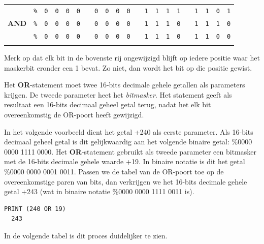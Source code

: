 \begin{center}
	\begin{tabular}{ccccccccccccccccccccc}
	  & \texttt{\%} & \texttt{0} & \texttt{0} & \texttt{0} & \texttt{0} & & \texttt{0} & \texttt{0} & \texttt{0} & \texttt{0} & & \texttt{1} & \texttt{1} & \texttt{1} & \texttt{1} & & \texttt{1} & \texttt{1} & \texttt{0} & \texttt{1} \\	  {\bf AND} & \texttt{\%} & \texttt{0} & \texttt{0} & \texttt{0} & \texttt{0} & & \texttt{0} & \texttt{0} & \texttt{0} & \texttt{0} & & \texttt{1} & \texttt{1} & \texttt{1} & \texttt{0} & & \texttt{1} & \texttt{1} & \texttt{1} & \texttt{0} \\ \hline	  & \texttt{\%} & \texttt{0} & \texttt{0} & \texttt{0} & \texttt{0} & & \texttt{0} & \texttt{0} & \texttt{0} & \texttt{0} &  & \texttt{1} & \texttt{1} & \texttt{1} & \texttt{0} & & \texttt{1} & \texttt{1} & \texttt{0} & \texttt{0} \\ \hhline{=====================}
	  \end{tabular}
\end{center}

Merk op dat elk bit in de bovenste rij ongewijzigd blijft op iedere positie waar het maskerbit eronder een 1 bevat. Zo niet, dan wordt het bit op die positie gewist.

Het {\bf OR}-statement moet twee 16-bits decimale gehele getallen als parameters krijgen. De tweede parameter heet het {\it bitmasker}. Het statement geeft als resultaat een 16-bits decimaal geheel getal terug, nadat het elk bit overeenkomstig de OR-poort heeft gewijzigd.

In het volgende voorbeeld dient het getal +240 als eerste parameter. Als 16-bits decimaal geheel getal is dit gelijkwaardig aan het volgende binaire getal: \%0000 0000 1111 0000. Het {\bf OR}-statement gebruikt als tweede parameter een bitmasker met de 16-bits decimale gehele waarde +19. In binaire notatie is dit het getal \%0000 0000 0001 0011. Passen we de tabel van de OR-poort toe op de overeenkomstige paren van bits, dan verkrijgen we het 16-bits decimale gehele getal +243 (wat in binaire notatie \%0000 0000 1111 0011 is).

\begin{tcolorbox}[colback=black,coltext=white]
\verbatimfont{\codefont}
\begin{verbatim}
PRINT (240 OR 19)
  243
\end{verbatim}
\end{tcolorbox}

In de volgende tabel is dit proces duidelijker te zien.

